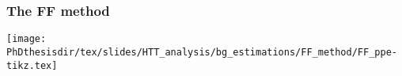 %
%

\begin{frame}
\frametitle{The FF method}
\begin{center}
\texttt{[image: \\PhDthesisdir/tex/slides/HTT\_analysis/bg\_estimations/FF\_method/FF\_ppe-tikz.tex]}
\end{center}
\end{frame}